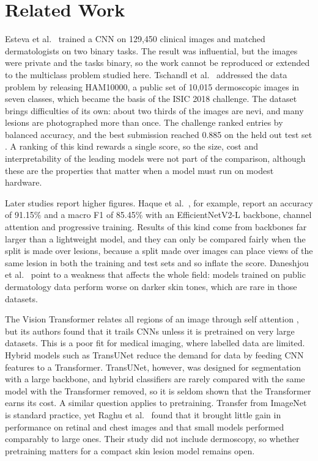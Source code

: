 \documentclass[runningheads]{llncs}
\begin{document}
\section{Related Work}

Esteva et al.\ \cite{esteva2017} trained a CNN on 129,450 clinical images and matched dermatologists on two binary tasks. The result was influential, but the images were private and the tasks binary, so the work cannot be reproduced or extended to the multiclass problem studied here. Tschandl et al.\ \cite{tschandl2018} addressed the data problem by releasing HAM10000, a public set of 10,015 dermoscopic images in seven classes, which became the basis of the ISIC 2018 challenge. The dataset brings difficulties of its own: about two thirds of the images are nevi, and many lesions are photographed more than once. The challenge ranked entries by balanced accuracy, and the best submission reached 0.885 on the held out test set \cite{codella2019}. A ranking of this kind rewards a single score, so the size, cost and interpretability of the leading models were not part of the comparison, although these are the properties that matter when a model must run on modest hardware.

Later studies report higher figures. Haque et al.\ \cite{haque2026}, for example, report an accuracy of 91.15\% and a macro F1 of 85.45\% with an EfficientNetV2-L backbone, channel attention and progressive training. Results of this kind come from backbones far larger than a lightweight model, and they can only be compared fairly when the split is made over lesions, because a split made over images can place views of the same lesion in both the training and test sets and so inflate the score. Daneshjou et al.\ \cite{daneshjou2022} point to a weakness that affects the whole field: models trained on public dermatology data perform worse on darker skin tones, which are rare in those datasets.

The Vision Transformer \cite{dosovitskiy2021} relates all regions of an image through self attention \cite{vaswani2017}, but its authors found that it trails CNNs unless it is pretrained on very large datasets. This is a poor fit for medical imaging, where labelled data are limited. Hybrid models such as TransUNet \cite{chen2021} reduce the demand for data by feeding CNN features to a Transformer. TransUNet, however, was designed for segmentation with a large backbone, and hybrid classifiers are rarely compared with the same model with the Transformer removed, so it is seldom shown that the Transformer earns its cost. A similar question applies to pretraining. Transfer from ImageNet \cite{deng2009} is standard practice, yet Raghu et al.\ \cite{raghu2019} found that it brought little gain in performance on retinal and chest images and that small models performed comparably to large ones. Their study did not include dermoscopy, so whether pretraining matters for a compact skin lesion model remains open.
\end{document}
